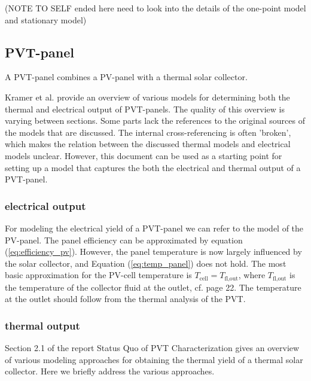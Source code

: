 (NOTE TO SELF ended here need to look into the details of the one-point model and stationary model)





\subsection{PVT-panel}

A PVT-panel combines a PV-panel with a thermal solar collector. 

Kramer et al. \cite{SHC2020PVT} provide an overview of various models for determining both the thermal and electrical output of PVT-panels. The quality of this overview is varying between sections. Some parts lack the references to the original sources of the models that are discussed. The internal cross-referencing is often 'broken', which makes the relation between the discussed thermal models and electrical models unclear. However, this document can be used as a starting point for setting up a model that captures the both the electrical and thermal output of a PVT-panel.

\subsubsection{electrical output}
For modeling the electrical yield of a PVT-panel we can refer to the model of the PV-panel. The panel efficiency can be approximated by equation (\ref{eq:efficiency_pv}). However, the panel temperature is now largely influenced by the solar collector, and Equation (\ref{eq:temp_panel}) does not hold. The most basic approximation for the PV-cell temperature is $T_{\text{cell}} = T_{\text{fl,out}}$, where $T_{\text{fl,out}} $ is the temperature of the collector fluid at the outlet, cf. \cite{SHC2020PVT} page 22. The temperature at the outlet should follow from the thermal analysis of the PVT.

\subsubsection{thermal output}
Section 2.1 of the report Status Quo of PVT Characterization \cite{SHC2020PVT} gives an overview of various modeling approaches for obtaining the thermal yield of a thermal solar collector.
Here we briefly address the various approaches.

